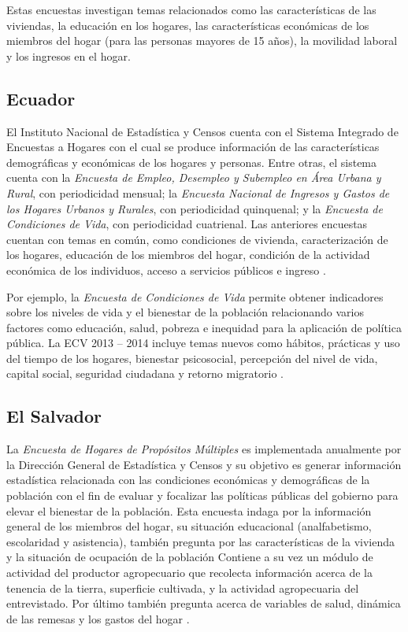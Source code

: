 \documentclass[12pt,spanish,]{book}
\begin{document}
Estas encuestas investigan temas relacionados como las características de las viviendas, la educación en los hogares, las características económicas de los miembros del hogar (para las personas mayores de 15 años), la movilidad laboral y los ingresos en el hogar.

\hypertarget{ecuador}{%
\subsection*{Ecuador}\label{ecuador}}

El Instituto Nacional de Estadística y Censos cuenta con el Sistema Integrado de Encuestas a Hogares con el cual se produce información de las características demográficas y económicas de los hogares y personas. Entre otras, el sistema cuenta con la \emph{Encuesta de Empleo, Desempleo y Subempleo en Área Urbana y Rural}, con periodicidad mensual; la \emph{Encuesta Nacional de Ingresos y Gastos de los Hogares Urbanos y Rurales}, con periodicidad quinquenal; y la \emph{Encuesta de Condiciones de Vida}, con periodicidad cuatrienal. Las anteriores encuestas cuentan con temas en común, como condiciones de vivienda, caracterización de los hogares, educación de los miembros del hogar, condición de la actividad económica de los individuos, acceso a servicios públicos e ingreso \autocite{INEC-EC}.

Por ejemplo, la \emph{Encuesta de Condiciones de Vida} permite obtener indicadores sobre los niveles de vida y el bienestar de la población relacionando varios factores como educación, salud, pobreza e inequidad para la aplicación de política pública. La ECV 2013 -- 2014 incluye temas nuevos como hábitos, prácticas y uso del tiempo de los hogares, bienestar psicosocial, percepción del nivel de vida, capital social, seguridad ciudadana y retorno migratorio \autocite{INEC2-EC}.

\hypertarget{el-salvador}{%
\subsection*{El Salvador}\label{el-salvador}}

La \emph{Encuesta de Hogares de Propósitos Múltiples} es implementada anualmente por la Dirección General de Estadística y Censos y su objetivo es generar información estadística relacionada con las condiciones económicas y demográficas de la población con el fin de evaluar y focalizar las políticas públicas del gobierno para elevar el bienestar de la población. Esta encuesta indaga por la información general de los miembros del hogar, su situación educacional (analfabetismo, escolaridad y asistencia), también pregunta por las características de la vivienda y la situación de ocupación de la población Contiene a su vez un módulo de actividad del productor agropecuario que recolecta información acerca de la tenencia de la tierra, superficie cultivada, y la actividad agropecuaria del entrevistado. Por último también pregunta acerca de variables de salud, dinámica de las remesas y los gastos del hogar \autocite{DIGESTYC-SV}.
\end{document}
